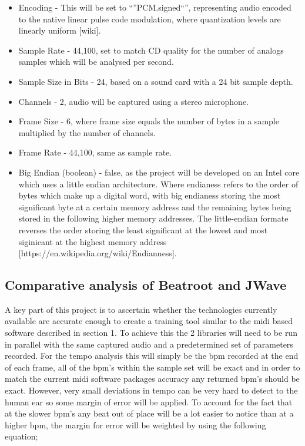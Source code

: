 \documentclass[a4paper, 11pt]{article}
\begin{document}
\begin{itemize}
\item Encoding - This will be set to ``''PCM.signed``'', representing audio encoded to the native linear pulse code modulation, where quantization levels are linearly uniform [wiki].
\item Sample Rate - 44,100, set to match CD quality for the number of analogs samples which will be analysed per second. 
\item Sample Size in Bits - 24, based on a sound card with a 24 bit sample depth.
\item Channels - 2, audio will be captured using a stereo microphone.
\item Frame Size - 6, where frame size equals the number of bytes in a sample multiplied by the number of channels.
\item Frame Rate - 44,100, same as sample rate.
\item Big Endian (boolean) - false, as the project will be developed on an Intel core which uses a little endian architecture. Where endianess refers to the order of bytes which make up a digital word, with big endianess storing the most significant byte at a certain memory address and the remaining bytes being stored in the following higher memory addresses. The little-endian formate reverses the order storing the least significant at the lowest and most siginicant at the highest memory address [https://en.wikipedia.org/wiki/Endianness].
\end{itemize}

\subsection{Comparative analysis of Beatroot and JWave}
A key part of this project is to ascertain whether the technologies currently available are accurate enough to create a training tool similar to the midi based software described in section 1. To achieve this the 2 libraries will need to be run in parallel with the same captured audio and a predetermined set of parameters recorded. For the tempo analysis this will simply be the bpm recorded at the end of each frame, all of the bpm's within the sample set will be exact and in order to match the current midi software packages accuracy any returned bpm's should be exact. However, very small deviations in tempo can be very hard to detect to the human ear so some margin of error will be applied. To account for the fact that at the slower bpm's any beat out of place will be a lot easier to notice than at a higher bpm, the margin for error will be weighted by using the following equation;
\end{document}
